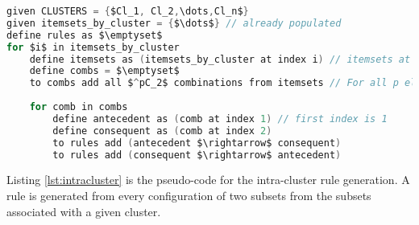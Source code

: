 \begin{lstlisting}[language=C, mathescape=true, caption=Intra-Cluster Rule Generation, label=lst:intracluster]
given CLUSTERS = {$Cl_1, Cl_2,\dots,Cl_n$}
given itemsets_by_cluster = {$\dots$} // already populated
define rules as $\emptyset$
for $i$ in itemsets_by_cluster
    define itemsets as (itemsets_by_cluster at index i) // itemsets at $i^{th}$ cluster.
    define combs = $\emptyset$
    to combs add all $^pC_2$ combinations from itemsets // For all p elements in itemsets
    
    for comb in combs
        define antecedent as (comb at index 1) // first index is 1
        define consequent as (comb at index 2)
        to rules add (antecedent $\rightarrow$ consequent)
        to rules add (consequent $\rightarrow$ antecedent) 
\end{lstlisting}
Listing \ref{lst:intracluster} is the pseudo-code for the intra-cluster rule generation. A rule is generated from every configuration of two subsets from the subsets associated with a given cluster.

